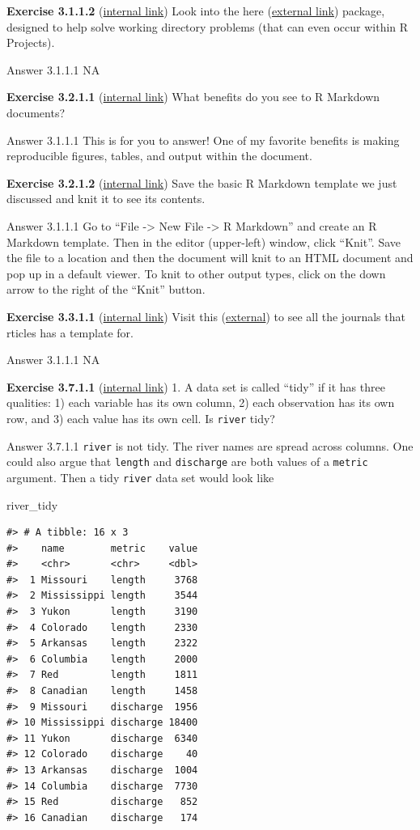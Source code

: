 \documentclass[
]{book}
\newenvironment{Shaded}{\begin{snugshade}}{\end{snugshade}}
\newcommand{\NormalTok}[1]{#1}
\begin{document}
\textbf{Exercise 3.1.1.2} (\protect\hyperlink{ex-set11}{internal link})
Look into the here (\href{https://here.r-lib.org/}{external link}) package, designed to help solve working directory problems (that can even occur within R Projects).

Answer 3.1.1.1
NA

\textbf{Exercise 3.2.1.1} (\protect\hyperlink{ex-set12}{internal link})
What benefits do you see to R Markdown documents?

Answer 3.1.1.1
This is for you to answer! One of my favorite benefits is making reproducible figures, tables, and output within the document.

\textbf{Exercise 3.2.1.2} (\protect\hyperlink{ex-set12}{internal link})
Save the basic R Markdown template we just discussed and knit it to see its contents.

Answer 3.1.1.1
Go to ``File -\textgreater{} New File -\textgreater{} R Markdown'' and create an R Markdown template. Then in the editor (upper-left) window, click ``Knit''. Save the file to a location and then the document will knit to an HTML document and pop up in a default viewer. To knit to other output types, click on the down arrow to the right of the ``Knit'' button.

\textbf{Exercise 3.3.1.1} (\protect\hyperlink{ex-set13}{internal link})
Visit this (\href{https://github.com/rstudio/rticles}{external}) to see all the journals that rticles has a template for.

Answer 3.1.1.1
NA

\textbf{Exercise 3.7.1.1} (\protect\hyperlink{ex-set14}{internal link})
1. A data set is called ``tidy'' if it has three qualities: 1) each variable has its own column, 2) each observation has its own row, and 3) each value has its own cell. Is \texttt{river} tidy?

Answer 3.7.1.1
\texttt{river} is not tidy. The river names are spread across columns. One could also argue that \texttt{length} and \texttt{discharge} are both values of a \texttt{metric} argument. Then a tidy \texttt{river} data set would look like

\begin{Shaded}
\begin{Highlighting}[]
\NormalTok{river_tidy}
\end{Highlighting}
\end{Shaded}

\begin{verbatim}
#> # A tibble: 16 x 3
#>    name        metric    value
#>    <chr>       <chr>     <dbl>
#>  1 Missouri    length     3768
#>  2 Mississippi length     3544
#>  3 Yukon       length     3190
#>  4 Colorado    length     2330
#>  5 Arkansas    length     2322
#>  6 Columbia    length     2000
#>  7 Red         length     1811
#>  8 Canadian    length     1458
#>  9 Missouri    discharge  1956
#> 10 Mississippi discharge 18400
#> 11 Yukon       discharge  6340
#> 12 Colorado    discharge    40
#> 13 Arkansas    discharge  1004
#> 14 Columbia    discharge  7730
#> 15 Red         discharge   852
#> 16 Canadian    discharge   174
\end{verbatim}
\end{document}
